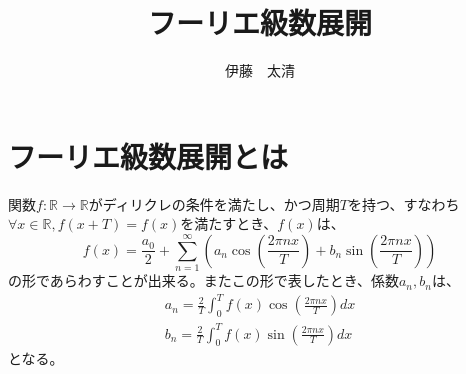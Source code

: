 \documentclass[a4paper]{jsarticle}
\title{フーリエ級数展開}
\author{伊藤　太清}
\begin{document}
\maketitle
\section{フーリエ級数展開とは}
関数$f: \mathbb{R} \longrightarrow \mathbb{R}$がディリクレの条件を満たし、かつ周期$T$を持つ、すなわち$\forall x \in \mathbb{R} , f \left( x + T \right) = f \left( x \right)$を満たすとき、$f \left( x \right)$は、
\begin{equation}
\label{FourierSeries}
f \left( x \right) = \frac { a_0 } { 2 } + \sum _{ n = 1} ^{ \infty } \left( a_n \cos( \frac { 2 \pi nx } { T } ) + b_n \sin( \frac { 2 \pi nx } { T } ) \right)
\end{equation}
の形であらわすことが出来る。またこの形で表したとき、係数$a_n,b_n$は、
\begin{eqnarray}
a_n = \frac { 2 } { T } \int _0 ^T f \left( x \right) \cos( \frac { 2 \pi nx } { T } ) dx \\
b_n = \frac { 2 } { T } \int _0 ^T f \left( x \right) \sin( \frac { 2 \pi nx } { T } ) dx
\end{eqnarray}
となる。
\end{document}
